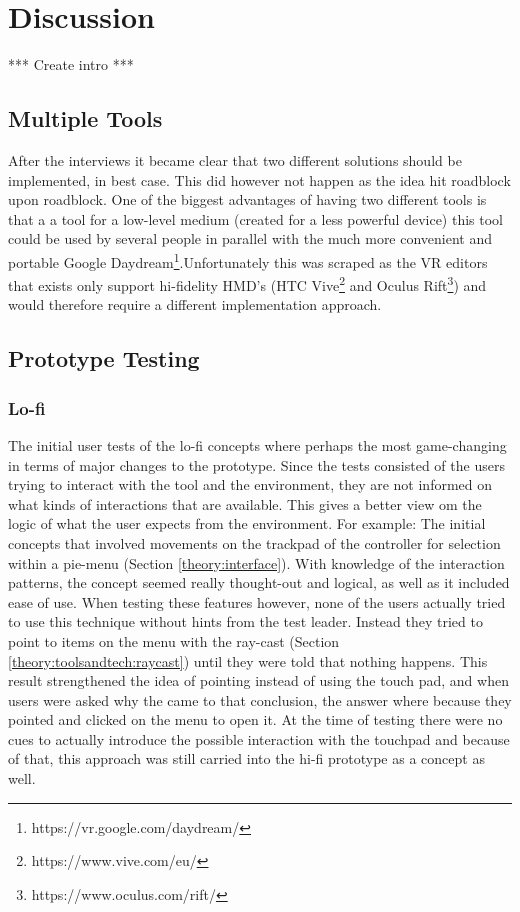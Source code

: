 
\chapter{Discussion}
*** Create intro ***
\section{Multiple Tools}
After the interviews it became clear that two different solutions should be implemented, in best case. This did however not happen as the idea hit roadblock upon roadblock. One of the biggest advantages of having two different tools is that a a tool for a low-level medium (created for a less powerful device) this tool could be used by several people in parallel with the much more convenient and portable Google Daydream\footnote{https://vr.google.com/daydream/}.Unfortunately this was scraped as the VR editors that exists only support hi-fidelity HMD's (HTC Vive\footnote{https://www.vive.com/eu/} and Oculus Rift\footnote{https://www.oculus.com/rift/}) and would therefore require a different implementation approach.
\section{Prototype Testing}
\subsection{Lo-fi}
The initial user tests of the lo-fi concepts where perhaps the most game-changing in terms of major changes to the prototype. Since the tests consisted of the users trying to interact with the tool and the environment, they are not informed on what kinds of interactions that are available. This gives a better view om the logic of what the user expects from the environment. For example: The initial concepts that involved movements on the trackpad of the controller for selection within a pie-menu (Section \ref{theory:interface}). With knowledge of the interaction patterns, the concept seemed really thought-out and logical, as well as it included ease of use. When testing these features however, none of the users actually tried to use this technique without hints from the test leader. Instead they tried to point to items on the menu with the ray-cast (Section \ref{theory:toolsandtech:raycast}) until they were told that nothing happens. This result strengthened the idea of pointing instead of using the touch pad, and when users were asked why the came to that conclusion, the answer where because they pointed and clicked on the menu to open it. At the time of testing there were no cues to actually introduce the possible interaction with the touchpad and because of that, this approach was still carried into the hi-fi prototype as a concept as well.

